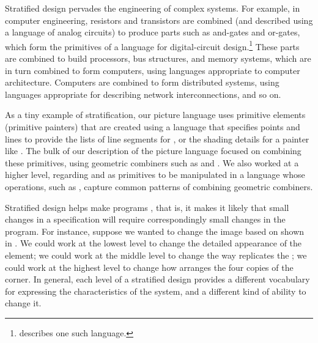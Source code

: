 Stratified design pervades the engineering of complex systems.  For example, in
computer engineering, resistors and transistors are combined (and described
using a language of analog circuits) to produce parts such as and-gates and
or-gates, which form the primitives of a language for digital-circuit
design.\footnote{ describes one such language.} These parts
are combined to build processors, bus structures, and memory systems, which are
in turn combined to form computers, using languages appropriate to computer
architecture.  Computers are combined to form distributed systems, using
languages appropriate for describing network interconnections, and so on.

As a tiny example of stratification, our picture language uses primitive
elements (primitive painters) that are created using a language that specifies
points and lines to provide the lists of line segments for
, or the shading details for a painter like
.  The bulk of our description of the picture language focused on
combining these primitives, using geometric combiners such as  and
.  We also worked at a higher level, regarding  and
 as primitives to be manipulated in a language whose operations,
such as , capture common patterns of combining geometric
combiners.

Stratified design helps make programs , that is, it makes it
likely that small changes in a specification will require correspondingly small
changes in the program.  For instance, suppose we wanted to change the image
based on  shown in .  We could work at the lowest
level to change the detailed appearance of the  element; we could
work at the middle level to change the way  replicates the
; we could work at the highest level to change how
 arranges the four copies of the corner.  In general, each
level of a stratified design provides a different vocabulary for expressing the
characteristics of the system, and a different kind of ability to change it.

